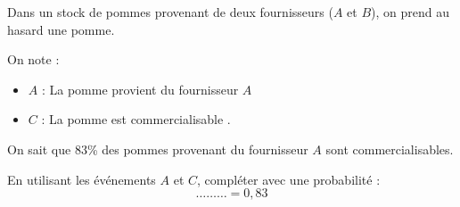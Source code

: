 \begin{exo}
	Dans un stock de pommes provenant de deux fournisseurs ($A$ et $B$), on prend au hasard une pomme. 

	On note :
	\begin{itemize}
		\item $A$ : \og{} La pomme provient du fournisseur $A$ \fg{}
		\item $C$ : \og{} La pomme est commercialisable \fg{}.
	\end{itemize}
	
	On sait que $83$\% des pommes provenant du fournisseur $A$ sont commercialisables.

	En utilisant les événements $A$ et $C$, compléter avec une probabilité :\vspace*{-2mm} $$\ldots \ldots \ldots = 0,83$$
\end{exo}
